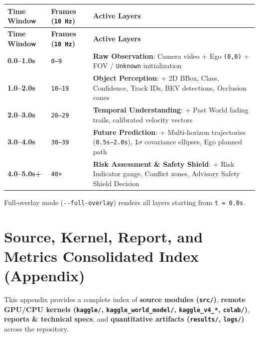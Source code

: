 \documentclass[10.5pt,a4paper]{article}
\begin{document}
\begin{footnotesize}
\setlength{\tabcolsep}{4pt}
\setlength{\LTleft}{0pt}\setlength{\LTright}{0pt}
\begin{longtable}{>{\raggedright\arraybackslash}p{} >{\raggedright\arraybackslash}p{} >{\raggedright\arraybackslash}p{}}
\toprule
\textbf{Time Window} & \textbf{Frames (\texttt{10 Hz})} & \textbf{Active Layers} \\
\midrule
\endfirsthead
\toprule
\textbf{Time Window} & \textbf{Frames (\texttt{10 Hz})} & \textbf{Active Layers} \\
\midrule
\endhead
\bottomrule
\endfoot
\textbf{0.0--1.0s} & \texttt{0--9} & \textbf{Raw Observation}: Camera video + Ego \texttt{(0,\allowbreak{}0)} + FOV / \texttt{Unknown} initialization \\
\textbf{1.0--2.0s} & \texttt{10--19} & \textbf{Object Perception}: + 2D BBox, Class, Confidence, Track IDs, BEV detections, Occlusion cones \\
\textbf{2.0--3.0s} & \texttt{20--29} & \textbf{Temporal Understanding}: + Past World fading trails, calibrated velocity vectors \\
\textbf{3.0--4.0s} & \texttt{30--39} & \textbf{Future Prediction}: + Multi-horizon trajectories (\texttt{0.\allowbreak{}5s--2.\allowbreak{}0s}), \texttt{1$\sigma$} covariance ellipses, Ego planned path \\
\textbf{4.0--5.0s+} & \texttt{40+} & \textbf{Risk Assessment \& Safety Shield}: + Risk Indicator gauge, Conflict zones, Advisory Safety Shield Decision \\
\end{longtable}
\end{footnotesize}


Full-overlay mode (\texttt{-\allowbreak{}-\allowbreak{}full-\allowbreak{}overlay}) renders all layers starting from \texttt{t = 0.\allowbreak{}0s}.

\newpage
\section{Source, Kernel, Report, and Metrics Consolidated Index (Appendix)}

This appendix provides a complete index of \textbf{source modules (\texttt{src/\allowbreak{}})}, \textbf{remote GPU/CPU kernels (\texttt{kaggle/\allowbreak{}}, \texttt{kaggle\_\allowbreak{}world\_\allowbreak{}model/\allowbreak{}}, \texttt{kaggle\_\allowbreak{}v4\_\allowbreak{}*}, \texttt{colab/\allowbreak{}})}, \textbf{reports \& technical specs}, and \textbf{quantitative artifacts (\texttt{results/\allowbreak{}}, \texttt{logs/\allowbreak{}})} across the repository.
\end{document}
